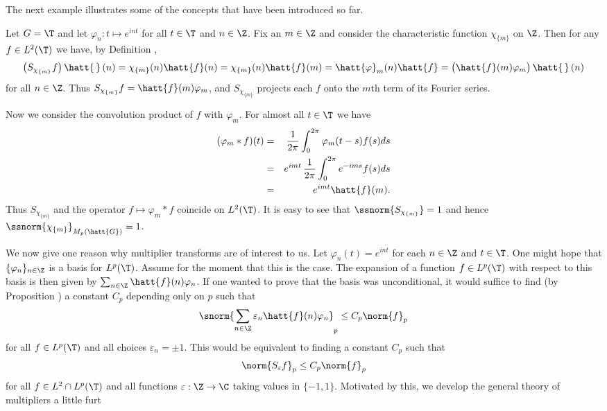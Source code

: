 The next example illustrates some of the concepts that
have been introduced so far.

\begin{example}\label{lca example}
Let $G=\T$ and let $\varphi_n:t\mapsto e^{int}$ for all $t\in\T$ and $n\in\Z$.
Fix an $m\in\Z$
and consider the characteristic function $\chi_{\{m\}}$ on $\Z$.
Then for any $f\in L^2(\T)$ we have, by Definition ,
\[\bigl(S_{\chi_{\{m\}}}f\bigr)\,\hatt{\,}\,(n)=\chi_{\{m\}}(n)\hatt{f}(n)
=\chi_{\{m\}}(n)\hatt{f}(m)=\hatt{\varphi}_m(n)\hatt{f}=
\bigl(\hatt{f}(m)\varphi_m\bigr)\,\hatt{\,}\,(n)\]
for all $n\in\Z$. Thus $S_{\chi_{\{m\}}}f=\hatt{f}(m)\varphi_m$, and
$S_{\chi_{\{m\}}}$ projects each $f$ onto the $m$th term of its Fourier
series.

Now we consider the convolution product of $f$ with $\varphi_m$.
For almost all $t\in\T$ we have
\begin{eqnarray*}
(\varphi_m*f)(t) &=& \frac{1}{2\pi}\int_0^{2\pi}\varphi_m(t-s)f(s)ds \\
& = & e^{imt}\,\frac{1}{2\pi}\int_0^{2\pi}e^{-ims}f(s)ds \\
& = & e^{imt}\hatt{f}(m).
\end{eqnarray*}
Thus $S_{\chi_{\{m\}}}$ and the operator $f\mapsto\varphi_m*f$ coincide on
$L^2(\T)$. It is easy to see that $\ssnorm{S_{\chi_{\{m\}}}}=1$ and hence
$\ssnorm{\chi_{\{m\}}}_{M_p(\hatt{G})}=1$.
\end{example}

We now give one reason why multiplier transforms are of interest to us.
Let $\varphi_n(t)=e^{int}$ for each $n\in\Z$ and $t\in\T$. One might hope that
$\{\varphi_n\}_{n\in\Z}$ is a basis for $L^p(\T)$. Assume for the moment that
this is the case. The expansion of a
function $f\in L^p(\T)$ with respect to this basis is then given by
$\sum_{n\in\Z}\hatt{f}(n)\varphi_n$.
If one wanted to prove that the basis was unconditional, it would suffice to
find (by Proposition ) a constant $C_p$
depending only on $p$ such that
\[\snorm{\sum_{n\in\Z}\varepsilon_n\hatt{f}(n)\varphi_n}_p\leq C_p\norm{f}_p\]
for all $f\in L^p(\T)$ and all choices
$\varepsilon_n=\pm 1$. This would be
equivalent to finding a constant $C_p$ such that
\[\norm{S_{\varepsilon}f}_p\leq C_p\norm{f}_p\]
for all $f\in L^2\cap L^p(\T)$ and all functions $\varepsilon:\Z\rightarrow\C$
taking values in $\{-1,1\}$. Motivated by this, we develop the general theory of
multipliers a little furt
